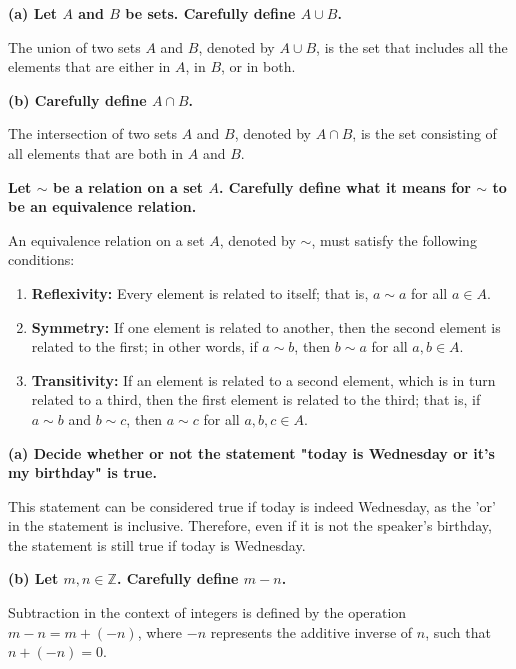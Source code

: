 \textbf{(a) Let \( A \) and \( B \) be sets. Carefully define \( A \cup B \).}

The union of two sets \( A \) and \( B \), denoted by \( A \cup B \), is the set that includes all the elements that are either in \( A \), in \( B \), or in both.

\textbf{(b) Carefully define \( A \cap B \).}

The intersection of two sets \( A \) and \( B \), denoted by \( A \cap B \), is the set consisting of all elements that are both in \( A \) and \( B \).


\textbf{Let \( \sim \) be a relation on a set \( A \). Carefully define what it means for \( \sim \) to be an equivalence relation.}

An equivalence relation on a set \( A \), denoted by \( \sim \), must satisfy the following conditions:
\begin{enumerate}
    \item \textbf{Reflexivity:} Every element is related to itself; that is, \( a \sim a \) for all \( a \in A \).
    \item \textbf{Symmetry:} If one element is related to another, then the second element is related to the first; in other words, if \( a \sim b \), then \( b \sim a \) for all \( a, b \in A \).
    \item \textbf{Transitivity:} If an element is related to a second element, which is in turn related to a third, then the first element is related to the third; that is, if \( a \sim b \) and \( b \sim c \), then \( a \sim c \) for all \( a, b, c \in A \).
\end{enumerate}


\textbf{(a) Decide whether or not the statement "today is Wednesday or it's my birthday" is true.}

This statement can be considered true if today is indeed Wednesday, as the 'or' in the statement is inclusive. Therefore, even if it is not the speaker's birthday, the statement is still true if today is Wednesday.

\textbf{(b) Let \( m, n \in \mathbb{Z} \). Carefully define \( m - n \).}

Subtraction in the context of integers is defined by the operation \( m - n = m + (-n) \), where \( -n \) represents the additive inverse of \( n \), such that \( n + (-n) = 0 \).

